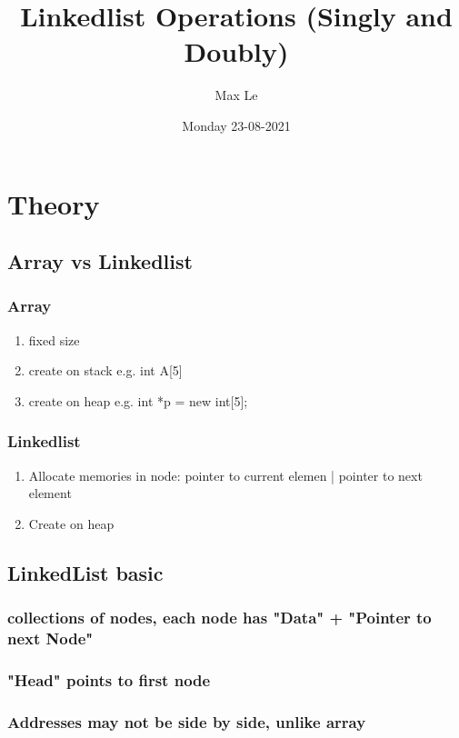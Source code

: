 \documentclass[11pt]{article}
\author{Max Le}
\date{Monday 23-08-2021}
\title{Linkedlist Operations (Singly and Doubly)}
\begin{document}
\maketitle
\tableofcontents

\section{Theory}
\label{sec:org2c4f776}
\subsection{Array vs Linkedlist}
\label{sec:org22100f3}
\subsubsection{Array}
\label{sec:org6e78577}
\begin{enumerate}
\item fixed size
\label{sec:org35ee98f}
\item create on stack e.g. int A[5]
\label{sec:org8db9558}
\item create on heap e.g. int *p = new int[5];
\label{sec:orgf35d1b9}
\end{enumerate}
\subsubsection{Linkedlist}
\label{sec:org3eb3ade}
\begin{enumerate}
\item Allocate memories in node:  pointer to current elemen | pointer to next element
\label{sec:org86c30cd}
\item Create on heap
\label{sec:org255dfd1}
\end{enumerate}
\subsection{LinkedList basic}
\label{sec:org16cc2ea}
\subsubsection{collections of nodes, each node has "Data" + "Pointer to next Node"}
\label{sec:org5bffec8}
\subsubsection{"Head" points to first node}
\label{sec:org2119e0b}
\subsubsection{Addresses may not be side by side, unlike array}
\label{sec:org676240a}
\end{document}
